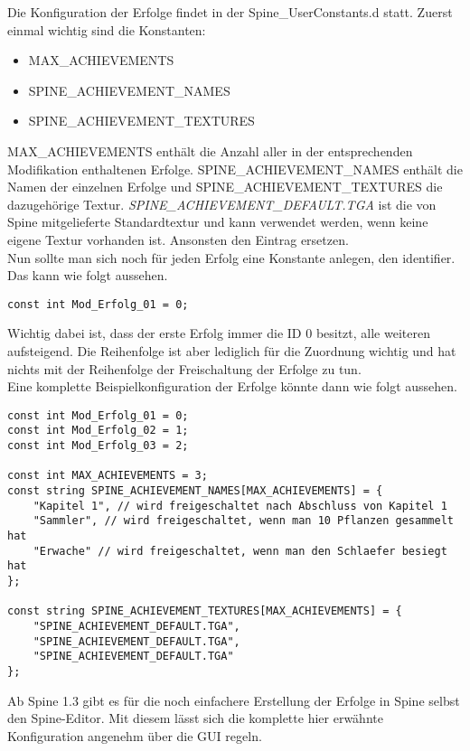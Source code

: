 \documentclass{article}
\begin{document}
Die Konfiguration der Erfolge findet in der Spine\_UserConstants.d statt. Zuerst einmal wichtig sind die Konstanten:

\begin{itemize}
	\item MAX\_ACHIEVEMENTS
	\item SPINE\_ACHIEVEMENT\_NAMES
	\item SPINE\_ACHIEVEMENT\_TEXTURES
\end{itemize}

MAX\_ACHIEVEMENTS enthält die Anzahl aller in der entsprechenden Modifikation enthaltenen Erfolge. SPINE\_ACHIEVEMENT\_NAMES enthält die Namen der einzelnen Erfolge und SPINE\_ACHIEVEMENT\_TEXTURES die dazugehörige Textur. \textit{SPINE\_ACHIEVEMENT\_DEFAULT.TGA} ist die von Spine mitgelieferte Standardtextur und kann verwendet werden, wenn keine eigene Textur vorhanden ist. Ansonsten den Eintrag ersetzen.\\

Nun sollte man sich noch für jeden Erfolg eine Konstante anlegen, den identifier. Das kann wie folgt aussehen.

\begin{lstlisting}
const int Mod_Erfolg_01 = 0;
\end{lstlisting}

Wichtig dabei ist, dass der erste Erfolg immer die ID 0 besitzt, alle weiteren aufsteigend. Die Reihenfolge ist aber lediglich für die Zuordnung wichtig und hat nichts mit der Reihenfolge der Freischaltung der Erfolge zu tun.\\

Eine komplette Beispielkonfiguration der Erfolge könnte dann wie folgt aussehen.

\begin{lstlisting}
const int Mod_Erfolg_01 = 0;
const int Mod_Erfolg_02 = 1;
const int Mod_Erfolg_03 = 2;

const int MAX_ACHIEVEMENTS = 3;
const string SPINE_ACHIEVEMENT_NAMES[MAX_ACHIEVEMENTS] = {
	"Kapitel 1", // wird freigeschaltet nach Abschluss von Kapitel 1
	"Sammler", // wird freigeschaltet, wenn man 10 Pflanzen gesammelt hat
	"Erwache" // wird freigeschaltet, wenn man den Schlaefer besiegt hat
};

const string SPINE_ACHIEVEMENT_TEXTURES[MAX_ACHIEVEMENTS] = {
	"SPINE_ACHIEVEMENT_DEFAULT.TGA",
	"SPINE_ACHIEVEMENT_DEFAULT.TGA",
	"SPINE_ACHIEVEMENT_DEFAULT.TGA"
};
\end{lstlisting}

Ab Spine 1.3 gibt es für die noch einfachere Erstellung der Erfolge in Spine selbst den Spine-Editor. Mit diesem lässt sich die komplette hier erwähnte Konfiguration angenehm über die GUI regeln.
\end{document}
